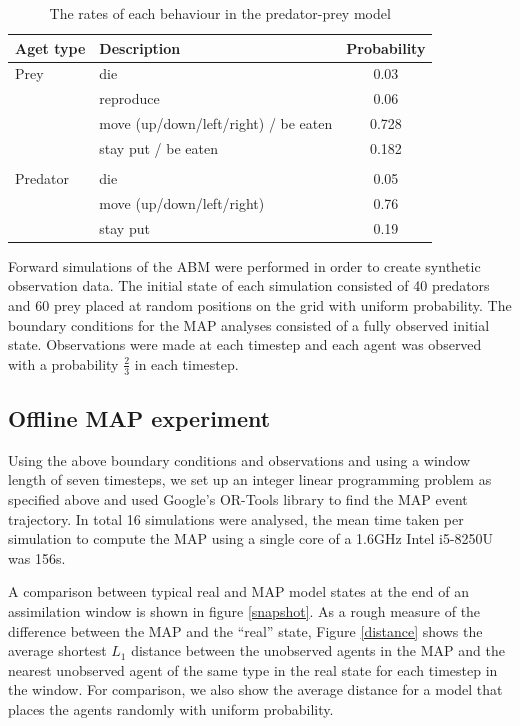 \documentclass[sigconf]{aamas}
\begin{document}
\begin{table}
\begin{center}
\begin{tabular}{llc}
\hline
Aget type & Description & Probability\\
\hline
Prey & die &        0.03\\
 & reproduce &        0.06\\
 & move (up/down/left/right) / be eaten &        0.728\\
 & stay put / be eaten &  0.182 \\
 &&\\
Predator & die  &      0.05\\
 & move (up/down/left/right)&        0.76\\
 & stay put & 0.19\\
\hline
\end{tabular}
\end{center}
\caption{The rates of each behaviour in the predator-prey model}
\label{rates}
\end{table}



Forward simulations of the ABM were performed in order to create synthetic observation data. The initial state of each simulation consisted of 40 predators and 60 prey placed at random positions on the grid with uniform probability. The boundary conditions for the MAP analyses consisted of a fully observed initial state. Observations were made at each timestep and each agent was observed with a probability $\frac{2}{3}$ in each timestep.

\subsection{Offline MAP experiment}

Using the above boundary conditions and observations and using a window length of seven timesteps, we set up an integer linear programming problem as specified above and used Google's OR-Tools\cite{googleortools} library to find the MAP event trajectory. In total 16 simulations were analysed, the mean time taken per simulation to compute the MAP using a single core of a 1.6GHz Intel i5-8250U was 156s.

A comparison between typical real and MAP model states at the end of an assimilation window is shown in figure \ref{snapshot}. As a rough measure of the difference between the MAP and the ``real'' state, Figure \ref{distance} shows the average shortest $L_1$ distance between the unobserved agents in the MAP and the nearest unobserved agent of the same type in the real state for each timestep in the window. For comparison, we also show the average distance for a model that places the agents randomly with uniform probability.
\end{document}
